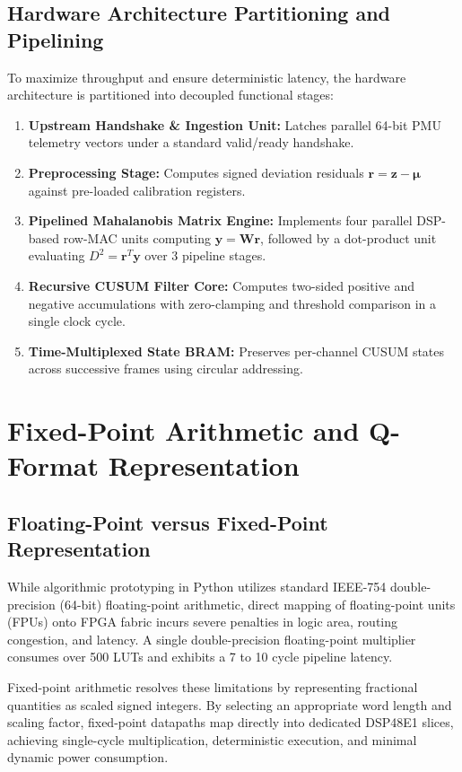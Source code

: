\documentclass[12pt,a4paper]{report}
\begin{document}
\subsection{Hardware Architecture Partitioning and Pipelining}
To maximize throughput and ensure deterministic latency, the hardware architecture is
partitioned into decoupled functional stages:
\begin{enumerate}
    \item \textbf{Upstream Handshake & Ingestion Unit:} Latches parallel 64-bit PMU telemetry
    vectors under a standard valid/ready handshake.
    \item \textbf{Preprocessing Stage:} Computes signed deviation residuals $\boldsymbol{r} = \boldsymbol{z} - \boldsymbol{\mu}$
    against pre-loaded calibration registers.
    \item \textbf{Pipelined Mahalanobis Matrix Engine:} Implements four parallel DSP-based
    row-MAC units computing $\boldsymbol{y} = \boldsymbol{W}\boldsymbol{r}$, followed by a
    dot-product unit evaluating $D^2 = \boldsymbol{r}^T \boldsymbol{y}$ over 3 pipeline stages.
    \item \textbf{Recursive CUSUM Filter Core:} Computes two-sided positive and negative
    accumulations with zero-clamping and threshold comparison in a single clock cycle.
    \item \textbf{Time-Multiplexed State BRAM:} Preserves per-channel CUSUM states across
    successive frames using circular addressing.
\end{enumerate}

\section{Fixed-Point Arithmetic and Q-Format Representation}

\subsection{Floating-Point versus Fixed-Point Representation}
While algorithmic prototyping in Python utilizes standard IEEE-754 double-precision (64-bit)
floating-point arithmetic, direct mapping of floating-point units (FPUs) onto FPGA fabric
incurs severe penalties in logic area, routing congestion, and latency. A single double-precision
floating-point multiplier consumes over 500 LUTs and exhibits a 7 to 10 cycle pipeline latency.

Fixed-point arithmetic resolves these limitations by representing fractional quantities
as scaled signed integers. By selecting an appropriate word length and scaling factor,
fixed-point datapaths map directly into dedicated DSP48E1 slices, achieving single-cycle
multiplication, deterministic execution, and minimal dynamic power consumption.
\end{document}
